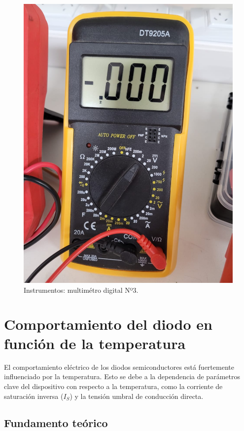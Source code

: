 \documentclass[chaptersright]{informeutn}
\begin{document}
\begin{figure}[h!]
\begin{minipage}{0.3\textwidth}
            \includegraphics[width=\textwidth]{pictures/multimetro-angelo.jpeg}
            \caption{Instrumentos: multimétro digital Nº3.}
        \end{minipage}
    \end{figure}
    

\chapter{Comportamiento del diodo en función de la temperatura}

  El comportamiento eléctrico de los diodos semiconductores está fuertemente influenciado por la temperatura. Esto se
  debe a la dependencia de parámetros clave del dispositivo con respecto a la temperatura, como la corriente de saturación 
  inversa (\(I_S\)) y la tensión umbral de conducción directa.
  
  \section{Fundamento teórico}
  
\end{document}
